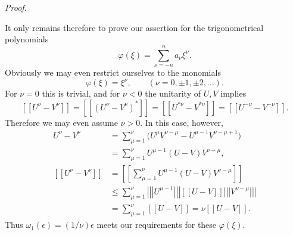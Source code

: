 \documentclass[b5paper,twoside]{article}
\theoremstyle{mvnplain}
\renewenvironment{proof}[1][Proof]{%
  \par\addvspace{0.35\baselineskip}%
  \noindent\textit{#1.}\ \normalfont\ignorespaces
}{%
  \par\addvspace{0.35\baselineskip}%
}
\newcommand{\Metric}[1]{\left[\!\left[#1\right]\!\right]}
\newcommand{\OpNorm}[1]{\left\lvert\left\lvert\left\lvert#1\right\rvert\right\rvert\right\rvert}
\def\Metric#1{[[#1]]}%
\begin{document}
\begin{proof}
It only remains therefore to prove our assertion for the trigonometrical
polynomials
\[
  \varphi(\xi)=\sum_{\nu=-n}^{n}a_\nu\xi^\nu.
\]
Obviously we may even restrict ourselves to the monomials
\[
  \varphi(\xi)=\xi^\nu,\qquad(\nu=0,\pm1,\pm2,\ldots).
\]
For $\nu=0$ this is trivial, and for $\nu<0$ the unitarity of $U,V$ implies
\[
  \Metric{U^\nu-V^\nu}
  =\Metric{(U^\nu-V^\nu)^*}
  =\Metric{U^{*\nu}-V^{*\nu}}
  =\Metric{U^{-\nu}-V^{-\nu}}.
\]
Therefore we may even assume $\nu>0$.  In this case, however,
\begin{align*}
  U^\nu-V^\nu
  &=\sum_{\mu=1}^{\nu}
    \bigl(U^\mu V^{\nu-\mu}-U^{\mu-1}V^{\nu-\mu+1}\bigr)\\
  &=\sum_{\mu=1}^{\nu}U^{\mu-1}(U-V)V^{\nu-\mu},\\
  \Metric{U^\nu-V^\nu}
  &=\Metric{\sum_{\mu=1}^{\nu}U^{\mu-1}(U-V)V^{\nu-\mu}}\\
  &\leq\sum_{\mu=1}^{\nu}
  \OpNorm{U^{\mu-1}}\Metric{U-V}\OpNorm{V^{\nu-\mu}}\\
  &=\sum_{\mu=1}^{\nu}\Metric{U-V}
   =\nu\Metric{U-V}.
\end{align*}
Thus $\omega_1(\epsilon)=(1/\nu)\epsilon$ meets our requirements for these
$\varphi(\xi)$.
\end{proof}
\end{document}
